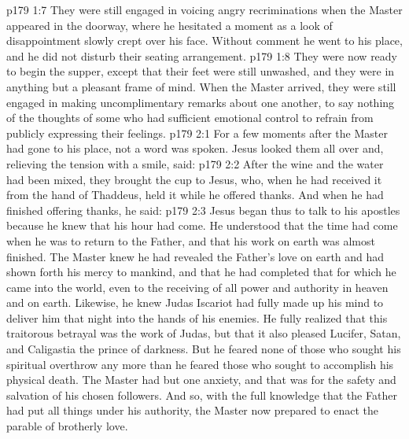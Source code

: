 \vs p179 1:7 \pc They were still engaged in voicing angry recriminations when the Master appeared in the doorway, where he hesitated a moment as a look of disappointment slowly crept over his face. Without comment he went to his place, and he did not disturb their seating arrangement.
\vs p179 1:8 They were now ready to begin the supper, except that their feet were still unwashed, and they were in anything but a pleasant frame of mind. When the Master arrived, they were still engaged in making uncomplimentary remarks about one another, to say nothing of the thoughts of some who had sufficient emotional control to refrain from publicly expressing their feelings.
\vs p179 2:1 For a few moments after the Master had gone to his place, not a word was spoken. Jesus looked them all over and, relieving the tension with a smile, said: 
\vs p179 2:2 After the wine and the water had been mixed, they brought the cup to Jesus, who, when he had received it from the hand of Thaddeus, held it while he offered thanks. And when he had finished offering thanks, he said: 
\vs p179 2:3 Jesus began thus to talk to his apostles because he knew that his hour had come. He understood that the time had come when he was to return to the Father, and that his work on earth was almost finished. The Master knew he had revealed the Father’s love on earth and had shown forth his mercy to mankind, and that he had completed that for which he came into the world, even to the receiving of all power and authority in heaven and on earth. Likewise, he knew Judas Iscariot had fully made up his mind to deliver him that night into the hands of his enemies. He fully realized that this traitorous betrayal was the work of Judas, but that it also pleased Lucifer, Satan, and Caligastia the prince of darkness. But he feared none of those who sought his spiritual overthrow any more than he feared those who sought to accomplish his physical death. The Master had but one anxiety, and that was for the safety and salvation of his chosen followers. And so, with the full knowledge that the Father had put all things under his authority, the Master now prepared to enact the parable of brotherly love.
